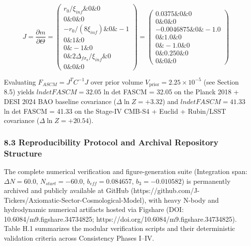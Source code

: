 \documentclass[aps,prd,onecolumn,superscriptaddress,nofootinbib,longbibliography,10pt]{revtex4-2}
\begin{document}
{{\[J = \frac{\partial m}{\partial \Theta} = \begin{pmatrix}
r_0/\xi_{inf} \& 0 \& 0 \\[4pt]
0 \& 0 \& 0 \\[4pt]
-r_0/(8\xi_{inf}) \& 0 \& -1 \\[4pt]
0 \& 1 \& 0 \\[4pt]
0 \& -1 \& 0 \\[4pt]
0 \& 2\Delta_{f\sigma_8}/\xi_{inf} \& 0 \\[4pt]
0 \& 0 \& 0
\end{pmatrix} = \begin{pmatrix}
0.0375 \& 0 \& 0 \\[4pt]
0 \& 0 \& 0 \\[4pt]
-0.0046875 \& 0 \& -1.0 \\[4pt]
0 \& 1.0 \& 0 \\[4pt]
0 \& -1.0 \& 0 \\[4pt]
0 \& \mathbf{0.250} \& 0 \\[4pt]
0 \& 0 \& 0
\end{pmatrix}\]



Evaluating \(F_{ASCM} = J^T C^{-1} J\) over prior volume \(V_{\text{prior}} = 2.25 \times 10^{-5}\) (see Section 8.5) yields $ln det FASCM = 32.05$ ln det FASCM = 32.05 on the Planck 2018 + DESI 2024 BAO baseline covariance (\(\Delta\ln Z = +3.32\)) and $ln det FASCM = 41.33$ ln det FASCM = 41.33 on the Stage-IV CMB-S4 + Euclid + Rubin/LSST covariance (\(\Delta\ln Z = +20.54\)).



  
\subsubsection*{8.3 Reproducibility Protocol and Archival Repository Structure}

  The complete numerical verification and figure-generation suite (Integration span: \(\Delta N = 60.0\), \(N_{start} = -60.0\), \(b_{eff} = 0.084657\), \(b_3 = -0.010582\)) is permanently archived and publicly available at GitHub (https://github.com/J-Tickers/Axiomatic-Sector-Cosmological-Model), with heavy N-body and hydrodynamic numerical artifacts hosted via Figshare (DOI: 10.6084/m9.figshare.34734825; https://doi.org/10.6084/m9.figshare.34734825). Table H.1 summarizes the modular verification scripts and their deterministic validation criteria across Consistency Phases I–IV.



}}
\end{document}
